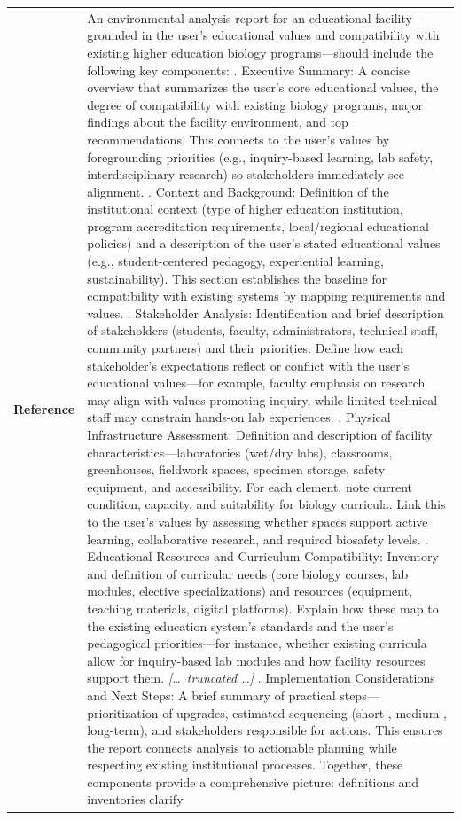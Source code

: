 \begin{longtable}{@{}l p{12.5cm}@{}}
  \textbf{Reference} & An environmental analysis report for an educational facility---grounded in the user's educational values and compatibility with existing higher education biology programs---should include the following key components: \newline 1. Executive Summary: A concise overview that summarizes the user's core educational values, the degree of compatibility with existing biology programs, major findings about the facility environment, and top recommendations. This connects to the user's values by foregrounding priorities (e.g., inquiry-based learning, lab safety, interdisciplinary research) so stakeholders immediately see alignment. \newline 2. Context and Background: Definition of the institutional context (type of higher education institution, program accreditation requirements, local/regional educational policies) and a description of the user's stated educational values (e.g., student-centered pedagogy, experiential learning, sustainability). This section establishes the baseline for compatibility with existing systems by mapping requirements and values. \newline 3. Stakeholder Analysis: Identification and brief description of stakeholders (students, faculty, administrators, technical staff, community partners) and their priorities. Define how each stakeholder's expectations reflect or conflict with the user's educational values---for example, faculty emphasis on research may align with values promoting inquiry, while limited technical staff may constrain hands-on lab experiences. \newline 4. Physical Infrastructure Assessment: Definition and description of facility characteristics---laboratories (wet/dry labs), classrooms, greenhouses, fieldwork spaces, specimen storage, safety equipment, and accessibility. For each element, note current condition, capacity, and suitability for biology curricula. Link this to the user's values by assessing whether spaces support active learning, collaborative research, and required biosafety levels. \newline 5. Educational Resources and Curriculum Compatibility: Inventory and definition of curricular needs (core biology courses, lab modules, elective specializations) and resources (equipment, teaching materials, digital platforms). Explain how these map to the existing education system's standards and the user's pedagogical priorities---for instance, whether existing curricula allow for inquiry-based lab modules and how facility resources support them. \newline \textit{[\ldots\ truncated \ldots]} \newline 11. Implementation Considerations and Next Steps: A brief summary of practical steps---prioritization of upgrades, estimated sequencing (short-, medium-, long-term), and stakeholders responsible for actions. This ensures the report connects analysis to actionable planning while respecting existing institutional processes. \newline Together, these components provide a comprehensive picture: definitions and inventories clarify 
\end{longtable}
